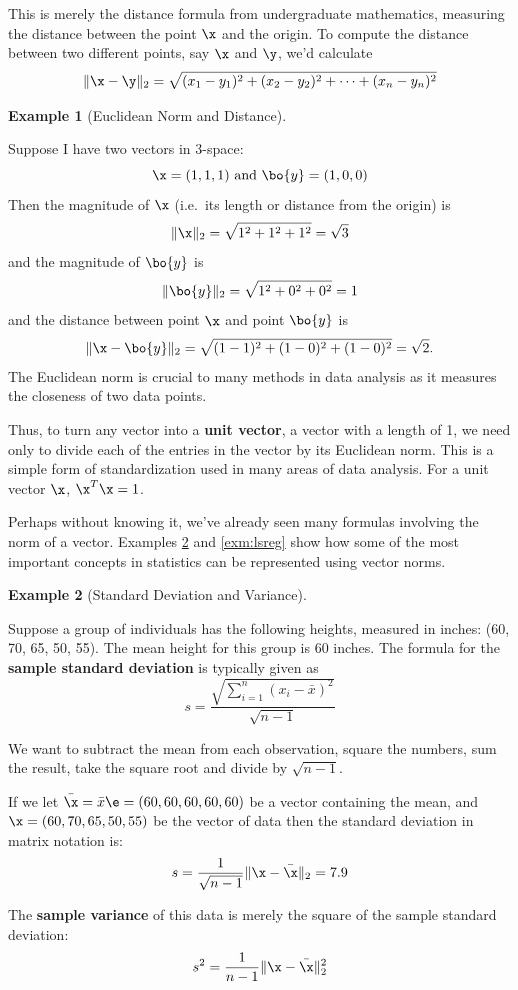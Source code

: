 \documentclass[
]{article}
\theoremstyle{definition}
\theoremstyle{definition}
\newtheorem{example}{Example}[section]
\theoremstyle{definition}
\theoremstyle{definition}
\theoremstyle{remark}
\begin{document}
This is merely the distance formula from undergraduate mathematics, measuring the distance between the point \(\x\) and the origin. To compute the distance between two different points, say \(\x\) and \(\y\), we'd calculate
\[\|\x-\y\|_2= \sqrt{(x_1-y_1)^2 + (x_2-y_2)^2 + \dots + (x_n-y_n)^2}\]

\begin{example}[Euclidean Norm and Distance]
\protect\hypertarget{exm:twonorm}{}\label{exm:twonorm}

Suppose I have two vectors in \(3\)-space:
\[\x=(1,1,1) \mbox{   and   } \bo{y}=(1,0,0)\]
Then the magnitude of \(\x\) (i.e.~its length or distance from the origin) is
\[\|\x\|_2=\sqrt{1^2+1^2+1^2}=\sqrt{3}\]
and the magnitude of \(\bo{y}\) is
\[\|\bo{y}\|_2=\sqrt{1^2+0^2+0^2}=1\]
and the distance between point \(\x\) and point \(\bo{y}\) is
\[ \|\x-\bo{y}\|_2=\sqrt{(1-1)^2 + (1-0)^2 + (1-0)^2} =\sqrt{2}.\]
The Euclidean norm is crucial to many methods in data analysis as it measures the closeness of two data points.

\end{example}

Thus, to turn any vector into a \textbf{unit vector}, a vector with a length of 1, we need only to divide each of the entries in the vector by its Euclidean norm. This is a simple form of standardization used in many areas of data analysis. For a unit vector \(\x\), \(\x^T\x=1\).

Perhaps without knowing it, we've already seen many formulas involving the norm of a vector. Examples \ref{exm:sdnorm} and \ref{exm:lsreg} show how some of the most important concepts in statistics can be represented using vector norms.

\begin{example}[Standard Deviation and Variance]
\protect\hypertarget{exm:sdnorm}{}\label{exm:sdnorm}

Suppose a group of individuals has the following heights, measured in inches: (60, 70, 65, 50, 55). The mean height for this group is 60 inches. The formula for the \textbf{sample standard deviation} is typically given as
\[s = \frac{\sqrt{\sum_{i=1}^n (x_i-\bar{x})^2}}{\sqrt{n-1}}\]

We want to subtract the mean from each observation, square the numbers, sum the result, take the square root and divide by \(\sqrt{n-1}\).

If we let \(\bar{\x}=\bar{x}\e=(60,60,60,60,60)\) be a vector containing the mean, and \(\x=(60, 70, 65, 50, 55)\) be the vector of data then the standard deviation in matrix notation is:
\[s=\frac{1}{\sqrt{n-1}}\|\x-\bar{\x}\|_2=7.9\]

The \textbf{sample variance} of this data is merely the square of the sample standard deviation:
\[s^2 = \frac{1}{n-1}\|\x-\bar{\x}\|_2^2\]

\end{example}
\end{document}
